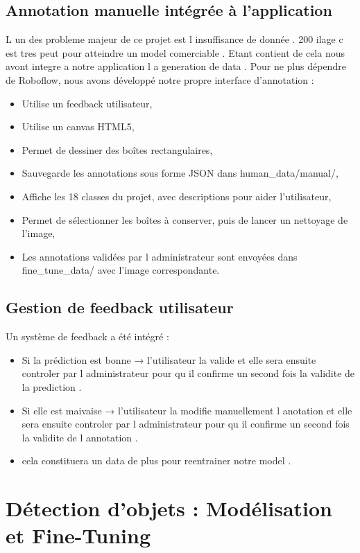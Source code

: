 \documentclass[12pt,a4paper]{report}
\begin{document}
\section{Annotation manuelle intégrée à l'application}
L un des probleme majeur de ce projet est l insuffisance de donnée . 200 ilage c est tres peut pour atteindre un model comerciable .
Etant contient de cela nous avont integre a notre application l a generation de data .
Pour ne plus dépendre de Roboflow, nous avons développé notre propre interface d'annotation :
\begin{itemize}
\item Utilise un feedback utilisateur,
\item Utilise un canvas HTML5,
\item Permet de dessiner des boîtes rectangulaires,
\item Sauvegarde les annotations sous forme JSON dans human\_data/manual/,
\item Affiche les 18 classes du projet, avec descriptions pour aider l'utilisateur,
\item Permet de sélectionner les boîtes à conserver, puis de lancer un nettoyage de l'image,
\item Les annotations validées par l administrateur sont envoyées dans fine\_tune\_data/ avec l'image correspondante.
\end{itemize}

\section{Gestion de feedback utilisateur}

Un système de feedback a été intégré :
\begin{itemize}
\item Si la prédiction est bonne → l'utilisateur la valide et elle sera ensuite controler par l administrateur pour qu il confirme un second fois la validite de la prediction . 

\item Si elle est  maivaise → l'utilisateur la modifie manuellement l anotation et elle sera ensuite controler par l administrateur pour qu il confirme un second fois la validite de l annotation  .
\item cela constituera un data de plus pour reentrainer notre model .

\end{itemize}

\chapter{ Détection d'objets : Modélisation et Fine-Tuning}
\end{document}
